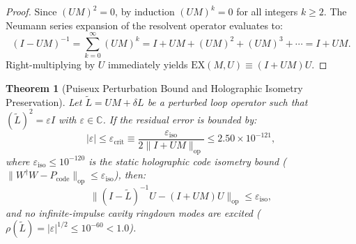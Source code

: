 \documentclass[11pt,onecolumn]{article}
\newtheorem{theorem}{Theorem}
\begin{document}
\begin{proof}
Since $(UM)^2 = 0$, by induction $(UM)^k = 0$ for all integers $k \ge 2$. The Neumann series expansion of the resolvent operator evaluates to:
\begin{equation}
    (I - UM)^{-1} = \sum_{k=0}^{\infty} (UM)^k = I + UM + (UM)^2 + (UM)^3 + \cdots = I + UM.
\end{equation}
Right-multiplying by $U$ immediately yields $\mathrm{EX}(M, U) \equiv (I + UM)U$.
\end{proof}

\begin{theorem}[Puiseux Perturbation Bound and Holographic Isometry Preservation]
\label{thm:puiseux_perturbation_bound}
Let $\tilde{L} = UM + \delta L$ be a perturbed loop operator such that $(\tilde{L})^2 = \varepsilon I$ with $\varepsilon \in \mathbb{C}$. If the residual error is bounded by:
\begin{equation}
    |\varepsilon| \le \varepsilon_{\mathrm{crit}} \equiv \frac{\varepsilon_{\mathrm{iso}}}{2 \|I + UM\|_{\mathrm{op}}} \le 2.50 \times 10^{-121},
\end{equation}
where $\varepsilon_{\mathrm{iso}} \le 10^{-120}$ is the static holographic code isometry bound ($\|W^\dagger W - P_{\mathrm{code}}\|_{\mathrm{op}} \le \varepsilon_{\mathrm{iso}}$), then:
\begin{equation}
    \|(I - \tilde{L})^{-1}U - (I + UM)U\|_{\mathrm{op}} \le \varepsilon_{\mathrm{iso}},
\end{equation}
and no infinite-impulse cavity ringdown modes are excited ($\rho(\tilde{L}) = |\varepsilon|^{1/2} \le 10^{-60} < 1.0$).
\end{theorem}
\end{document}
